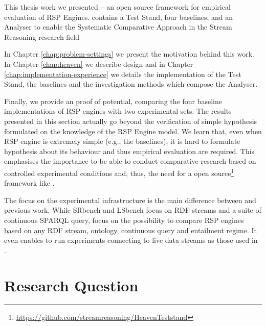 This thesis work we presented \name -- an open source framework for empirical evaluation of RSP Engines. \name contains a Test Stand, four baselines, and an Analyser to enable the Systematic Comparative Approach in the Stream Reasoning research field

In Chapter \ref{chap:problem-settings} we present the motivation behind this work. In Chapter \ref{chap:heaven} we describe \name design and in Chapter \ref{chap:implementation-experience} we details the implementation of the Test Stand, the baselines and the investigation methods which compose the Analyser.

Finally, we provide an proof of \name potential, comparing the four baseline implementations of RSP engines with two experimental sets. The results presented in this section actually  go beyond the verification of simple hypothesis formulated on the knowledge of the RSP Engine model. We learn that, even when RSP engine is extremely simple (e.g., the baselines), it is hard to formulate  hypothesis about its behaviour and thus empirical evaluation are required. This emphasises the importance to be able to conduct comparative research based on controlled experimental conditions and, thus, the need for a open source\footnote{\url{https://github.com/streamreasoning/HeavenTeststand}} framework like \namens.

The focus on the experimental infrastructure is the main difference between \name and previous work. While SRbench and LSbench focus on RDF streams and a suite of continuous SPARQL query, \name focus on the possibility to compare RSP engines based on any RDF stream, ontology, continuous query and entailment regime. It even enables to run experiments connecting to live data streams as those used in \cite{DBLP:conf/semweb/BalduiniVDTPC13}.



\section{Research Question}

